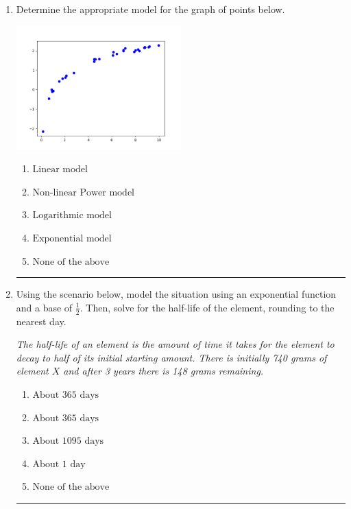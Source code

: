 \documentclass[14pt]{extbook}
\newcommand{\litem}[1]{\item#1\hspace*{-1cm}\rule{\textwidth}{0.4pt}}
\begin{document}
\begin{enumerate}
{\begin{enumerate}[label=\Alph*.]
\end{enumerate} }
\litem{
Determine the appropriate model for the graph of points below.
\begin{center}
    \includegraphics[width=0.5\textwidth]{../Figures/identifyModelGraph11CopyB.png}
\end{center}
\begin{enumerate}[label=\Alph*.]
\item \( \text{Linear model} \)
\item \( \text{Non-linear Power model} \)
\item \( \text{Logarithmic model} \)
\item \( \text{Exponential model} \)
\item \( \text{None of the above} \)

\end{enumerate} }
\litem{
Using the scenario below, model the situation using an exponential function and a base of $\frac{1}{2}$. Then, solve for the half-life of the element, rounding to the nearest day.
\begin{center}
    \textit{ The half-life of an element is the amount of time it takes for the element to decay to half of its initial starting amount. There is initially 740 grams of element $X$ and after 3 years there is 148 grams remaining. }
\end{center}
\begin{enumerate}[label=\Alph*.]
\item \( \text{About } 365 \text{ days} \)
\item \( \text{About } 365 \text{ days} \)
\item \( \text{About } 1095 \text{ days} \)
\item \( \text{About } 1 \text{ day} \)
\item \( \text{None of the above} \)


\end{enumerate}}
\end{enumerate}
\end{document}
